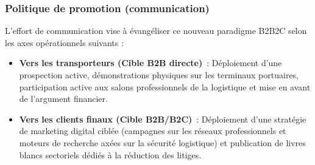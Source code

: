 \subsubsection{Politique de promotion (communication)}
L'effort de communication vise à évangéliser ce nouveau paradigme B2B2C selon les axes opérationnels suivants :
\begin{itemize}[label=\textcolor{argosblue}{\textbf{>}}]
    \item \textbf{Vers les transporteurs (Cible B2B directe)}~: Déploiement d'une prospection active, démonstrations physiques sur les terminaux portuaires, participation active aux salons professionnels de la logistique et mise en avant de l'argument financier.
    \item \textbf{Vers les clients finaux (Cible B2B/B2C)}~: Déploiement d'une stratégie de marketing digital ciblée (campagnes sur les réseaux professionnels et moteurs de recherche axées sur la sécurité logistique) et publication de livres blancs sectoriels dédiés à la réduction des litiges.
\end{itemize}
